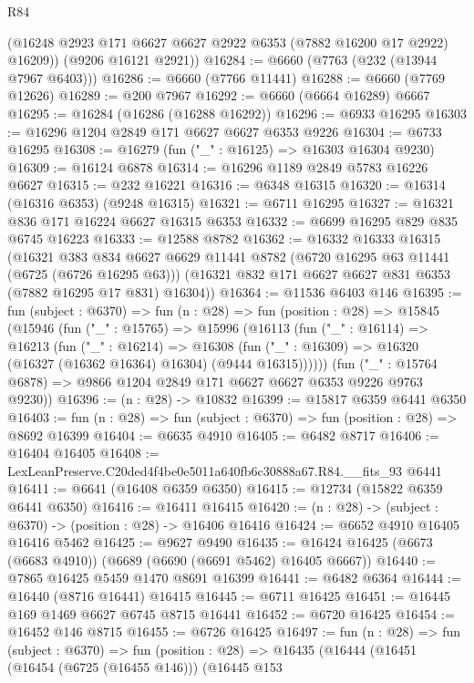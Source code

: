 \begin{lexlean}{R84}
\begin{coremodule}
        (@16248 @2923 @171 @6627 @6627 @2922 @6353 (@7882 @16200 @17 @2922) @16209))
      (@9206 @16121 @2921))
@16284 := @6660 (@7763 (@232 (@13944 @7967 @6403)))
@16286 := @6660 (@7766 @11441)
@16288 := @6660 (@7769 @12626)
@16289 := @200 @7967
@16292 := @6660 (@6664 @16289) @6667
@16295 := @16284 (@16286 (@16288 @16292))
@16296 := @6933 @16295
@16303 := @16296 @1204 @2849 @171 @6627 @6627 @6353 @9226
@16304 := @6733 @16295
@16308 := @16279 (fun ("_" : @16125) => @16303 @16304 @9230)
@16309 := @16124 @6878
@16314 := @16296 @1189 @2849 @5783 @16226 @6627
@16315 := @232 @16221
@16316 := @6348 @16315
@16320 := @16314 (@16316 @6353) (@9248 @16315)
@16321 := @6711 @16295
@16327 := @16321 @836 @171 @16224 @6627 @16315 @6353
@16332 := @6699 @16295 @829 @835 @6745 @16223
@16333 := @12588 @8782
@16362 := @16332
    @16333
    @16315
    (@16321
      @383
      @834
      @6627
      @6629
      @11441
      @8782
      (@6720 @16295 @63 @11441 (@6725 (@6726 @16295 @63)))
      (@16321 @832 @171 @6627 @6627 @831 @6353 (@7882 @16295 @17 @831) @16304))
@16364 := @11536 @6403 @146
@16395 := fun (subject : @6370) =>
  fun (n : @28) =>
  fun (position : @28) =>
  @15845
    (@15946
      (fun ("_" : @15765) =>
      @15996
        (@16113
          (fun ("_" : @16114) =>
          @16213
            (fun ("_" : @16214) =>
            @16308 (fun ("_" : @16309) => @16320 (@16327 (@16362 @16364) @16304) (@9444 @16315))))))
      (fun ("_" : @15764 @6878) => @9866 @1204 @2849 @171 @6627 @6627 @6353 @9226 @9763 @9230))
@16396 := (n : @28) -> @10832
@16399 := @15817 @6359 @6441 @6350
@16403 := fun (n : @28) => fun (subject : @6370) => fun (position : @28) => @8692 @16399
@16404 := @6635 @4910
@16405 := @6482 @8717
@16406 := @16404 @16405
@16408 := LexLeanPreserve.C20ded4f4be0e5011a640fb6c30888a67.R84.__fits_93 @6441
@16411 := @6641 (@16408 @6359 @6350)
@16415 := @12734 (@15822 @6359 @6441 @6350)
@16416 := @16411 @16415
@16420 := (n : @28) -> (subject : @6370) -> (position : @28) -> @16406 @16416
@16424 := @6652 @4910 @16405 @16416 @5462
@16425 := @9627 @9490
@16435 := @16424 @16425 (@6673 (@6683 @4910)) (@6689 (@6690 (@6691 @5462) @16405 @6667))
@16440 := @7865 @16425 @5459 @1470 @8691 @16399
@16441 := @6482 @6364
@16444 := @16440 (@8716 @16441) @16415
@16445 := @6711 @16425
@16451 := @16445 @169 @1469 @6627 @6745 @8715 @16441
@16452 := @6720 @16425
@16454 := @16452 @146 @8715
@16455 := @6726 @16425
@16497 := fun (n : @28) =>
  fun (subject : @6370) =>
  fun (position : @28) =>
  @16435
    (@16444
      (@16451
        (@16454 (@6725 (@16455 @146)))
        (@16445
          @153

\end{coremodule}
\end{lexlean}
